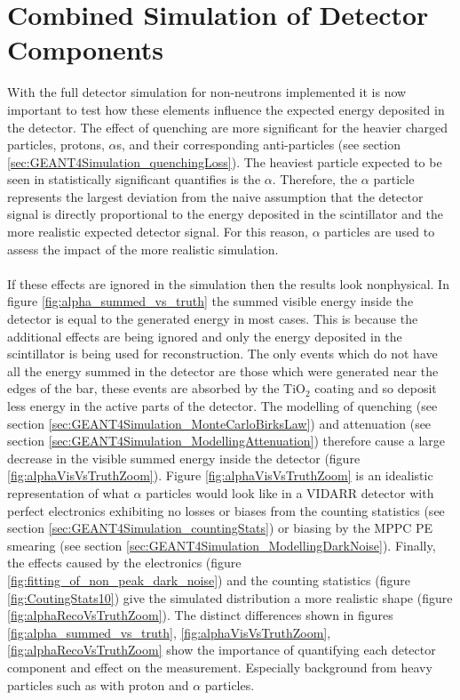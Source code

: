 \section{Combined Simulation of Detector Components}\label{sec:GEANT4Simulation_resultsPhysicalElectronics}
With the full detector simulation for non-neutrons implemented it is now important to test how these elements influence the expected energy deposited in the detector. The effect of quenching are more significant for the heavier charged particles, protons, $\alpha$s, and their corresponding anti-particles (see section \ref{sec:GEANT4Simulation_quenchingLoss}). The heaviest particle expected to be seen in statistically significant quantifies is the $\alpha$. Therefore, the $\alpha$ particle represents the largest deviation from the naive assumption that the detector signal is directly proportional to the energy deposited in the scintillator and the more realistic expected detector signal. For this reason, $\alpha$ particles are used to assess the impact of the more realistic simulation.  
\\\\If these effects are ignored in the simulation then the results look nonphysical. In figure \ref{fig:alpha_summed_vs_truth} the summed visible energy inside the detector is equal to the generated energy in most cases. This is because the additional effects are being ignored and only the energy deposited in the scintillator is being used for reconstruction. The only events which do not have all the energy summed in the detector are those which were generated near the edges of the bar, these events are absorbed by the TiO$_2$ coating and so deposit less energy in the active parts of the detector. The modelling of quenching (see section \ref{sec:GEANT4Simulation_MonteCarloBirksLaw}) and attenuation (see section \ref{sec:GEANT4Simulation_ModellingAttenuation}) therefore cause a large decrease in the visible summed energy inside the detector (figure \ref{fig:alphaVisVsTruthZoom}). Figure \ref{fig:alphaVisVsTruthZoom} is an idealistic representation of what $\alpha$ particles would look like in a VIDARR detector with perfect electronics exhibiting no losses or biases from the counting statistics (see section \ref{sec:GEANT4Simulation_countingStats}) or biasing by the MPPC PE smearing (see section \ref{sec:GEANT4Simulation_ModellingDarkNoise}). Finally, the effects caused by the electronics (figure \ref{fig:fitting_of_non_peak_dark_noise}) and the counting statistics (figure \ref{fig:CoutingStats10}) give the simulated distribution a more realistic shape (figure \ref{fig:alphaRecoVsTruthZoom}). The distinct differences shown in figures \ref{fig:alpha_summed_vs_truth}, \ref{fig:alphaVisVsTruthZoom}, \ref{fig:alphaRecoVsTruthZoom} show the importance of quantifying each detector component and effect on the measurement. Especially background from heavy particles such as with proton and $\alpha$ particles. %



